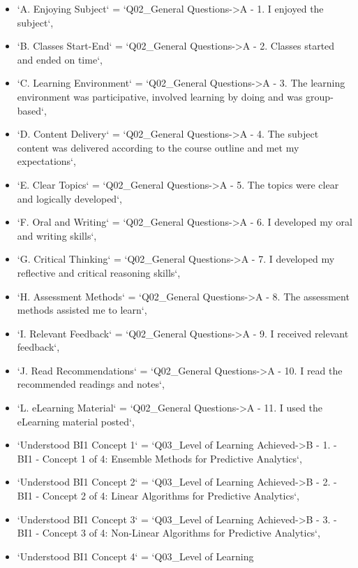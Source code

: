 \documentclass[
]{article}
\begin{document}
\begin{itemize}
\item
  `A. Enjoying Subject` = `Q02\_General Questions-\textgreater A - 1. I
  enjoyed the subject`,
\item
  `B. Classes Start-End` = `Q02\_General Questions-\textgreater A - 2.
  Classes started and ended on time`,
\item
  `C. Learning Environment` = `Q02\_General Questions-\textgreater A -
  3. The learning environment was participative, involved learning by
  doing and was group-based`,
\item
  `D. Content Delivery` = `Q02\_General Questions-\textgreater A - 4.
  The subject content was delivered according to the course outline and
  met my expectations`,
\item
  `E. Clear Topics` = `Q02\_General Questions-\textgreater A - 5. The
  topics were clear and logically developed`,
\item
  `F. Oral and Writing` = `Q02\_General Questions-\textgreater A - 6. I
  developed my oral and writing skills`,
\item
  `G. Critical Thinking` = `Q02\_General Questions-\textgreater A - 7. I
  developed my reflective and critical reasoning skills`,
\item
  `H. Assessment Methods` = `Q02\_General Questions-\textgreater A - 8.
  The assessment methods assisted me to learn`,
\item
  `I. Relevant Feedback` = `Q02\_General Questions-\textgreater A - 9. I
  received relevant feedback`,
\item
  `J. Read Recommendations` = `Q02\_General Questions-\textgreater A -
  10. I read the recommended readings and notes`,
\item
  `L. eLearning Material` = `Q02\_General Questions-\textgreater A - 11.
  I used the eLearning material posted`,
\item
  `Understood BI1 Concept 1` = `Q03\_Level of Learning
  Achieved-\textgreater B - 1. - BI1 - Concept 1 of 4: Ensemble Methods
  for Predictive Analytics`,
\item
  `Understood BI1 Concept 2` = `Q03\_Level of Learning
  Achieved-\textgreater B - 2. - BI1 - Concept 2 of 4: Linear Algorithms
  for Predictive Analytics`,
\item
  `Understood BI1 Concept 3` = `Q03\_Level of Learning
  Achieved-\textgreater B - 3. - BI1 - Concept 3 of 4: Non-Linear
  Algorithms for Predictive Analytics`,
\item
  `Understood BI1 Concept 4` = `Q03\_Level of Learning

\end{itemize}
\end{document}
